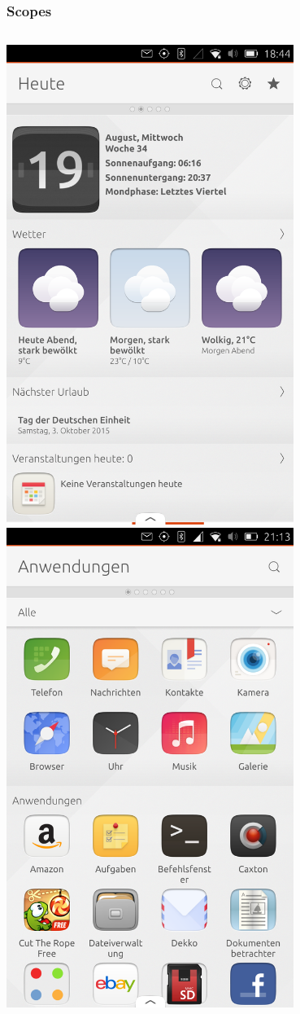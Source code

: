 \documentclass{beamer}
\begin{document}
\begin{frame}
  \frametitle{Scopes}
  \begin{columns}
      \includegraphics[width=0.7\textwidth]{images/scope}
      \includegraphics[width=0.7\textwidth]{images/applauncher}
  \end{columns}
\end{frame}
\end{document}
